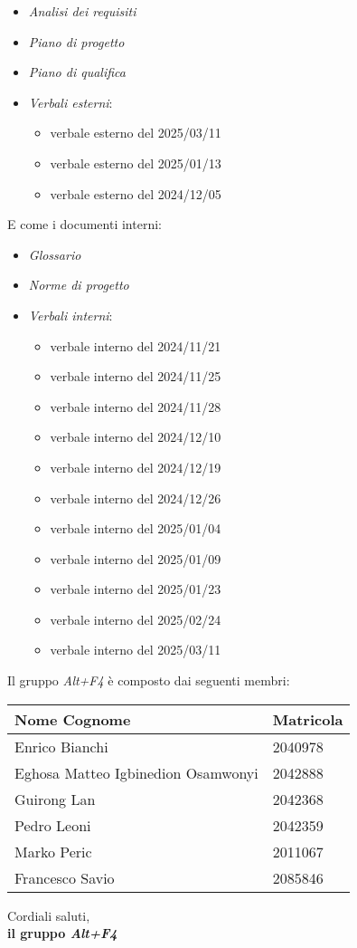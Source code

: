 \documentclass[a4paper, 12pt]{article}
\begin{document}
\begin{itemize}
    \item \textit{Analisi dei requisiti}
    \item \textit{Piano di progetto}
    \item \textit{Piano di qualifica}
    \item \textit{Verbali esterni}:
    \begin{itemize}
        \item verbale esterno del 2025/03/11
        \item verbale esterno del 2025/01/13
        \item verbale esterno del 2024/12/05
    \end{itemize}
\end{itemize}
\noindent
E come i documenti interni:
\begin{itemize}
    \item \textit{Glossario}
    \item \textit{Norme di progetto}
    \item \textit{Verbali interni}:
    \begin{itemize}
        \item verbale interno del 2024/11/21
        \item verbale interno del 2024/11/25
        \item verbale interno del 2024/11/28
        \item verbale interno del 2024/12/10
        \item verbale interno del 2024/12/19
        \item verbale interno del 2024/12/26
        \item verbale interno del 2025/01/04
        \item verbale interno del 2025/01/09
        \item verbale interno del 2025/01/23
        \item verbale interno del 2025/02/24
        \item verbale interno del 2025/03/11
    \end{itemize}
\end{itemize}
\vspace{0.75cm} 
\noindent
Il gruppo \textit{Alt+F4} è composto dai seguenti membri:
\begin{table}[H]
    \centering
    \begin{tabular}{| l | l |}
    \hline
    \textbf{Nome Cognome} & 
    \textbf{Matricola}\\ 
        \hline
            Enrico Bianchi&
            2040978 \\
        \hline 
            Eghosa Matteo Igbinedion Osamwonyi&
            2042888 \\
        \hline 
            Guirong Lan&
            2042368 \\
        \hline 
            Pedro Leoni&
            2042359 \\
        \hline 
            Marko Peric&
            2011067 \\
        \hline 
            Francesco Savio&
            2085846 \\
        \hline 
    \end{tabular}
\end{table}
\noindent
Cordiali saluti,\\
\textbf{il gruppo \textit{Alt+F4}}
\end{document}
